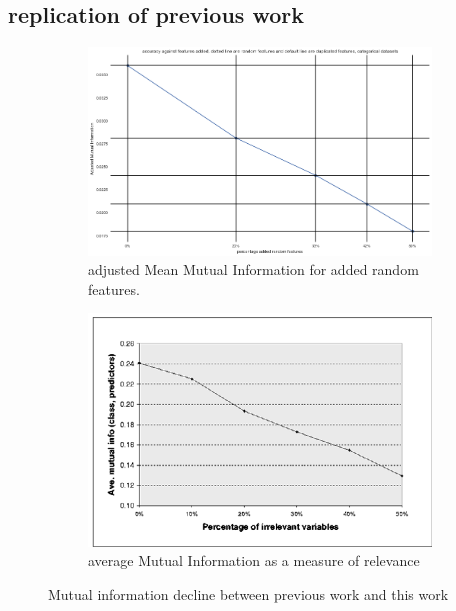 \documentclass[a4paper,10pt]{article}
\begin{document}
\subsection{replication of previous work}

\begin{figure}[H]
	\centering
	\begin{subfigure}[b]{0.45\textwidth}
		\includegraphics[width=\textwidth]{images/MutualInformationDecay.png}
		\caption{adjusted Mean Mutual Information for added random features.}
		\label{fig:AMMIdecay}
	\end{subfigure}
	\begin{subfigure}[b]{0.45\textwidth}
		\includegraphics[width=\textwidth]{images/MutualInformationDecay-paper.png}
		\caption{average Mutual Information as a measure of relevance}
		\label{fig:AMMIpaper}
	\end{subfigure}
	\caption{Mutual information decline between previous work and this work}\label{fig:MMIs}
	\label{paper-thesis}
\end{figure}
\end{document}
